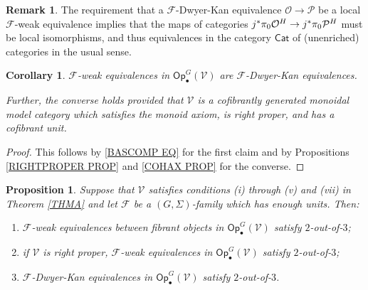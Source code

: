 \documentclass[a4paper,10pt
,draft
]{article}%
\numberwithin{equation}{section}
\numberwithin{figure}{section}
\newtheorem{proposition}[equation]{Proposition}%
\newtheorem{corollary}[equation]{Corollary}%
\theoremstyle{definition} %
\newtheorem{remark}[equation]{Remark}%
\newcommand{\F}{\ensuremath{\mathcal F}}
\newcommand{\V}{\ensuremath{\mathcal V}}
\renewcommand{\O}{\ensuremath{\mathcal O}}
\renewcommand{\P}{\ensuremath{\mathcal P}}
\newcommand{\1}{\ensuremath{\mathbbm 1}}%
\begin{document}
\begin{remark}\label{CATEQUIV REM}
The requirement that 
a $\F$-Dwyer-Kan equivalence $\O \to \P$
be a local $\F$-weak equivalence
implies that the maps of categories 
$j^{\**}\pi_0 \O^H \to j^{\**}\pi_0 \P^H$
must be local isomorphisms, 
and thus equivalences in the category $\mathsf{Cat}$
of (unenriched) categories in the usual sense.
\end{remark}



\begin{corollary}\label{WEDKEQ COR}
$\F$-weak equivalences in $\mathsf{Op}^G_\bullet(\V)$
are $\F$-Dwyer-Kan equivalences.
	
Further, the converse holds provided that
$\V$ is a cofibrantly generated monoidal model category
which satisfies the monoid axiom, is right proper,
and has a cofibrant unit.	
\end{corollary}

\begin{proof}
	This follows by \eqref{BASCOMP EQ} for the first claim
	and by Propositions \ref{RIGHTPROPER PROP} and \ref{COHAX PROP}
	for the converse.
\end{proof}






\begin{proposition}\label{2OUTOF3 PROP}
Suppose that $\V$ satisfies conditions
(i) through (v) and (vii) in Theorem \ref{THMA} and 
let $\F$ be a $(G,\Sigma)$-family which has enough units. 
Then:
\begin{enumerate}[label=(\roman*)]
\item $\F$-weak equivalences between fibrant objects in $\mathsf{Op}^G_\bullet(\V)$
satisfy $2$-out-of-$3$;
\item if $\V$ is right proper, $\F$-weak equivalences in $\mathsf{Op}^G_\bullet(\V)$
satisfy $2$-out-of-$3$;
\item $\F$-Dwyer-Kan equivalences in $\mathsf{Op}^G_\bullet(\V)$
satisfy $2$-out-of-$3$.
\end{enumerate}
\end{proposition}
\end{document}
